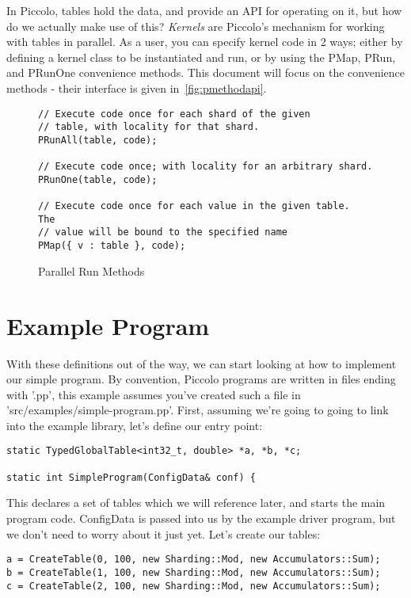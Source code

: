 \documentclass[10pt]{article}
\newcommand{\p}{Piccolo\xspace}
\begin{document}
In \p, tables hold the data, and provide an API for operating on it, but how do
we actually make use of this?  {\em Kernels} are \p's mechanism for working with
tables in parallel.  As a user, you can specify kernel code in 2 ways; either by
defining a kernel class to be instantiated and run, or by using the PMap, PRun,
and PRunOne convenience methods.  This document will focus on the convenience
methods - their interface is given in~\ref{fig:pmethodapi}.

 \begin{figure}[h!]
\begin{lstlisting}
// Execute code once for each shard of the given 
// table, with locality for that shard.
PRunAll(table, code);

// Execute code once; with locality for an arbitrary shard.
PRunOne(table, code);

// Execute code once for each value in the given table.  The
// value will be bound to the specified name
PMap({ v : table }, code);
\end{lstlisting}
\caption{\sffamily Parallel Run Methods \label{fig:methodapi}}
\end{figure}

\section{Example Program}
With these definitions out of the way, we can start looking at how to implement
our simple program.  By convention, \p programs are written in files ending with
'.pp', this example assumes you've created such a file in
'src/examples/simple-program.pp'.  First, assuming we're going to going to link
into the example library, let's define our entry point:

\begin{lstlisting}
static TypedGlobalTable<int32_t, double> *a, *b, *c;

static int SimpleProgram(ConfigData& conf) {
\end{lstlisting} 

This declares a set of tables which we will reference later, and starts the main
program code. {\ttfamily ConfigData} is passed into us by the example driver
program, but we don't need to worry about it just yet.  Let's create our tables:

\begin{lstlisting}
a = CreateTable(0, 100, new Sharding::Mod, new Accumulators::Sum);
b = CreateTable(1, 100, new Sharding::Mod, new Accumulators::Sum);
c = CreateTable(2, 100, new Sharding::Mod, new Accumulators::Sum);
\end{lstlisting}
\end{document}
